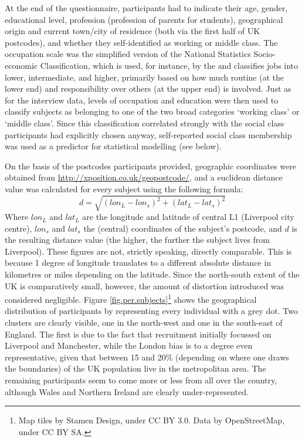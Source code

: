 At the end of the questionnaire, participants had to indicate their age, gender, educational level, profession (profession of parents for students), geographical origin and current town/city of residence (both via the first half of UK postcodes), and whether they self-identified as working or middle class.
The occupation scale was the simplified version of the National Statistics Socio-economic Classification, which is used, for instance, by the \citeauthor{nomis} and classifies jobs into lower, intermediate, and higher, primarily based on how much routine (at the lower end) and responsibility over others (at the upper end) is involved.
Just as for the interview data, levels of occupation and education were then used to classify subjects as belonging to one of the two broad categories `working class' or `middle class'.
Since this classification correlated strongly with the social class participants had explicitly chosen anyway, self-reported social class membership was used as a predictor for statistical modelling (see below).

On the basis of the postcodes participants provided, geographic coordinates were obtained from \url{http://xposition.co.uk/geopostcode/}, and a euclidean distance value was calculated for every subject using the following formula:
\begin{equation}
d = \sqrt{(lon_L - lon_s)^2 + (lat_L - lat_s)^2}
\end{equation}
Where \(lon_L\) and \(lat_L\) are the longitude and latitude of central L1 (Liverpool city centre), \(lon_s\) and \(lat_s\) the (central) coordinates of the subject's postcode, and \(d\) is the resulting distance value (the higher, the further the subject lives from Liverpool).
These figures are not, strictly speaking, directly comparable.
This is because 1 degree of longitude translates to a different absolute distance in kilometres or miles depending on the latitude.
Since the north-south extent of the UK is comparatively small, however, the amount of distortion introduced was considered negligible.
Figure \ref{fig.per.subjects}\footnote{Map tiles by Stamen Design, under CC BY 3.0. Data by OpenStreetMap, under CC BY SA.} shows the geographical distribution of participants by representing every individual with a grey dot.
Two clusters are clearly visible, one in the north-west and one in the south-east of England.
The first is due to the fact that recruitment initially focussed on Liverpool and Manchester, while the London bias is to a degree even representative, given that between 15 and 20\% (depending on where one draws the boundaries) of the UK population live in the metropolitan area.
The remaining participants seem to come more or less from all over the country, although Wales and Northern Ireland are clearly under-represented.

